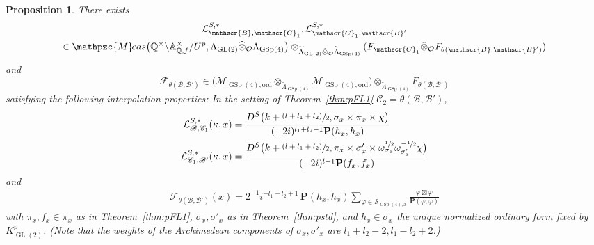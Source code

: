 \documentclass[10pt]{amsart}
\newcommand{\psfrac}[2]{\sfrac{(#1)}{#2}}
\theoremstyle{plain}
\newtheorem{prop}[thm]{Proposition}
\theoremstyle{remark}
\newcommand{\bA}{\mathbb{A}}
\newcommand{\bQ}{\mathbb{Q}}
\newcommand{\cF}{\mathcal{F}}
\newcommand{\cL}{\mathcal{L}}
\newcommand{\cM}{\mathcal{M}}
\newcommand{\cO}{\mathcal{O}}
\newcommand{\sB}{\mathscr{B}}
\newcommand{\sC}{\mathscr{C}}
\newcommand{\sS}{\mathscr{S}}
\newcommand{\bfP}{\mathbf{P}}
\DeclareMathOperator{\GL}{GL}
\DeclareMathOperator{\GSp}{GSp}
\newcommand{\Meas}{\mathpzc{M}\mkern-2mu eas}
\newcommand{\ord}{\mathrm{ord}}
\let\wh\widehat
\let\wt\widetilde
\begin{document}
\begin{prop}\label{prop:modpLf}
There exists\vspace*{-5pt}
\begin{multline*}
\cL^{S,\ast}_{\sB,\sC_1},\cL^{S,\ast}_{\sC_1,\sB'}\\
\in\Meas\bigl(\bQ^\times\backslash\bA^\times_{\bQ,f}/U^p,\Lambda_{\GL(2)}\wh{\otimes}_{\cO} \Lambda_{\GSp(4)}\bigr)\otimes_{\wt{\Lambda}_{\GL(2)}\hat{\otimes}_\cO\wt{\Lambda}_{\GSp(4)}} (F_{\sC_1}\hat{\otimes}_\cO F_{\theta(\sB,\sB')})
\end{multline*}
and\vspace*{-5pt}
\[
\cF_{\theta(\sB,\sB')} \in \bigl(\cM_{\GSp(4),\ord}\otimes_{\wt{\Lambda}_{\GSp(4)}} \cM_{\GSp(4),\ord}\bigr)\otimes_{\wt{\Lambda}_{\GSp(4)}} F_{\theta(\sB,\sB')}
\]
satisfying the following interpolation properties: In the setting of Theorem~\ref{thm:pFL1} $\sC_2=\theta(\sB,\sB')$,\vspace*{-5pt}
\begin{align*}
\cL^{S,\ast}_{\sB,\sC_1}(\kappa,x)&=\frac{D^S\bigl(k+\psfrac{l+l_1+l_2}{2},\sigma_x\times\pi_x\times\chi\bigr)}{(-2i)^{l_1+l_2-1}\bfP(h_x,h_x)}\\
\cL^{S,\ast}_{\sC_1,\sB'}(\kappa,x)&=\frac{D^S\bigl(k+\psfrac{l+l_1+l_2}{2},\pi_x\times\sigma'_x\times\omega^{\sfrac{1}{2}}_{\sigma_x}\omega^{-\sfrac{1}{2}}_{\sigma'_x}\chi\bigr)}{(-2i)^{l+1}\bfP(f_x,f_x)}
\end{align*}
and
\begin{align*}
\cF_{\theta(\sB,\sB')}(x)= 2^{-1}i^{-l_1-l_2+1}\,\bfP(h_x,h_x)\sum_{\varphi\in\sS_{\GSp(4),x}} \frac{\varphi\boxtimes\varphi}{\bfP(\varphi,\varphi)}
\end{align*}
with $\pi_x,f_x\in\pi_x$ as in Theorem~\ref{thm:pFL1}, $\sigma_x,\sigma'_x$ as in Theorem~\ref{thm:pstd}, and $h_x\in\sigma_x$ the unique normalized ordinary form fixed by $K^p_{\GL(2)}$. (Note that the weights of the Archimedean components of $\sigma_x,\sigma'_x$ are $l_1+l_2-2,l_1-l_2+2$.)
\end{prop}
\end{document}
